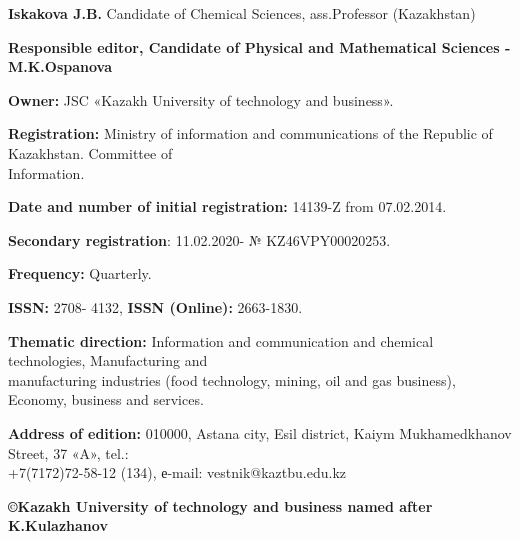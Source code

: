 {\textbf{Iskakova J.B.} Candidate of Chemical Sciences, ass.Professor (Kazakhstan)

\begin{center}
\textbf{Responsible editor, Candidate of Physical and Mathematical Sciences - M.K.Ospanova}
\end{center}

\textbf{Owner:} JSC «Kazakh University of technology and business».

\textbf{Registration:} Ministry of information and communications of the Republic of Kazakhstan. Committee of \\Information.

\textbf{Date and number of initial registration:} 14139-Z from 07.02.2014.

\textbf{Secondary registration}: 11.02.2020- № KZ46VPY00020253.

\textbf{Frequency:} Quarterly.

\textbf{ISSN:} 2708- 4132, \textbf{ISSN (Online):} 2663-1830.

\textbf{Thematic direction:} Information and communication and chemical
technologies, Manufacturing and \\manufacturing industries (food
technology, mining, oil and gas business), Economy, business and services.

\textbf{Address of edition:} 010000, Astana city, Esil district, Kaiym
Mukhamedkhanov Street, 37 «A», tel.: \\+7(7172)72-58-12 (134),
е-mail: vestnik@kaztbu.edu.kz
\vfill
\begin{center}
\textbf{\normalsize ©Kazakh University of technology and business named after K.Kulazhanov}
\end{center}
}
\pagebreak
